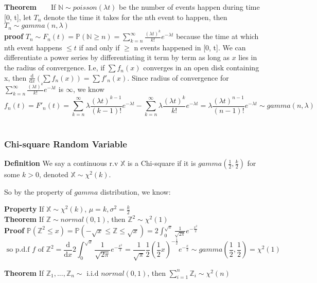 \documentclass[a4paper,12pt]{article}
\begin{document}
\textbf{Theorem}\ \ \ \ 
If $\mathbb{N} \sim poisson(\lambda t)$ be the number of events happen during time [0, t], let $T_n$ denote the time it takes for the nth event to happen, then $T_n \sim gamma(n, \lambda)$\\

\textbf{proof} $T_n \sim F_n(t) = \mathbb{P}( \mathbb{N} \geq n ) = \sum_{k=n}^\infty \frac{(\lambda t)^k}{k!}e^{-\lambda t}$ because the time at which nth event happens $\leq t$ if and only if $\geq$ n events happened in [0, t]. We can differentiate a power series by differentiating it term by term as long as $x$ lies in the radius of convergence. I.e, if $\sum f_n(x) $ converges in an open disk containing x, then $ \frac{\mathrm{d}}{\mathrm{d} x} ( \sum f_n(x) ) = \sum f'_n(x) $. Since radius of convergence for $\sum_{k=n}^\infty \frac{(\lambda t)^k}{k!}e^{-\lambda t}$ is $\infty$, we know $$f_n(t) = F'_n(t) = \sum_{k=n}^\infty \lambda\frac{(\lambda t)^{k-1}}{(k-1)!}e^{-\lambda t}  - \sum_{k=n}^\infty \lambda\frac{(\lambda t)^k}{k!}e^{-\lambda t} = \lambda\frac{(\lambda t)^{n-1}}{(n-1)!}e^{-\lambda t} \sim gamma(n, \lambda)$$\\

\subsubsection{Chi-square Random Variable }
\textbf{Definition} We say a continuous r.v $\mathbb{X}$ is a Chi-square if it is $gamma( \frac{1}{2}, \frac{k}{2} )$ for some $k > 0$, denoted $\mathbb{X} \sim \chi^2(k)$.

So by the property of $gamma$ distribution, we know:

\textbf{Property} If $\mathbb{X} \sim \chi^2(k)$, $\mu = k, \sigma^2 = \frac{k}{2}$\\

\textbf{Theorem} If $\mathbb{Z} \sim normal(0, 1)$, then $\mathbb{Z}^2 \sim \chi^2(1)$\\

\textbf{Proof} $\mathbb{P}(\mathbb{Z}^2 \leq x) = \mathbb{P}(-\sqrt{x} \leq \mathbb{Z} \leq \sqrt{x}) =  2\int_0^{\sqrt{x}} \frac{1}{\sqrt{2\pi}}e^{-\frac{x^2}{2}} $
$$ \text{ so p.d.f } f \text{ of } \mathbb{Z}^2 = \frac{\mathrm{d}}{\mathrm{d}x}2\int_0^{\sqrt{x}} \frac{1}{\sqrt{2\pi}}e^{-\frac{x^2}{2}} = \frac{1}{\sqrt{\pi}}\frac{1}{2}(\frac{1}{2} x)^{-\frac{1}{2}}e^{-\frac{x}{2}} \sim gamma(\frac{1}{2}, \frac{1}{2}) = \chi^2(1)$$

\textbf{Theorem} If $\mathbb{Z}_1, ..., \mathbb{Z}_n \sim \text{ i.i.d } normal(0, 1)$, then $\sum_{i=1}^n \mathbb{Z}_i \sim \chi^2(n)$\\
\end{document}
